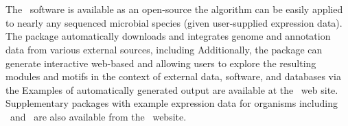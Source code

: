 \subsubsection{\cm\ }

\DIFaddend The \cm\ software is available as an open-source \DIFdelbegin {}\DIFdelend \DIFaddbegin {} \DIFaddend the algorithm can be easily
applied to nearly any sequenced microbial species (given user-supplied
expression data). The package automatically downloads and integrates
genome and annotation data from various external sources, including
\DIFdelbegin {}\DIFdelend \DIFaddbegin {} 
\DIFaddend Additionally, the package can generate
interactive web-based and \DIFdelbegin {}\DIFdelend \DIFaddbegin {} \DIFaddend allowing users to explore the resulting modules
and motifs in the context of external data, software, and databases
via the \DIFdelbegin {}\DIFdelend \DIFaddbegin {} \DIFaddend Examples of automatically
generated output are available at the \cm\ web site. Supplementary \DIFdelbegin {}\DIFdelend \DIFaddbegin {}\DIFaddend packages with example expression data for organisms including
\halo\ and \eco\ are also available from the \cm\ website.

